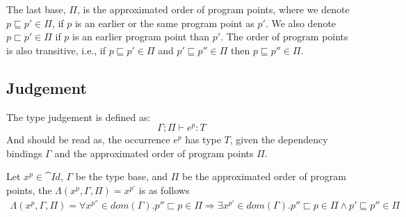\documentclass[../../master.tex]{subfiles}
\begin{document}
The last base, $\Pi$, is the approximated order of program points, where we denote $p\sqsubseteq p'\in\Pi$, if $p$ is an earlier or the same program point as $p'$.
We also denote $p \sqsubset p'\in\Pi$ if $p$ is an earlier program point than $p'$.
The order of program points is also transitive, i.e., if $p\sqsubseteq p'\in\Pi$ and $p'\sqsubseteq p''\in\Pi$ then $p\sqsubseteq p''\in\Pi$.
\fi

\subsection{Judgement}
The type judgement is defined as:
$$\Gamma;\Pi\vdash e^p: T$$
And should be read as, the occurrence $e^p$ has type $T$, given the dependency bindings $\Gamma$ and the approximated order of program points $\Pi$.

\begin{definition}
	Let $x^p\in \cat{Id}$, $\Gamma$ be the type base, and $\Pi$ be the approximated order of program points, the $\Lambda(x^p,\Gamma,\Pi)=x^{p'}$ is as follows
	\begin{align*}
		\Lambda(x^p,\Gamma,\Pi)=\forall x^{p''}\in dom(\Gamma). p''\sqsubset p\in\Pi\Rightarrow \exists x^{p'}\in dom(\Gamma).p''\sqsubset p\in\Pi\wedge p'\sqsubseteq p''\in\Pi
	\end{align*}
\end{definition}



\begin{landscape}

\end{landscape}
\end{document}
